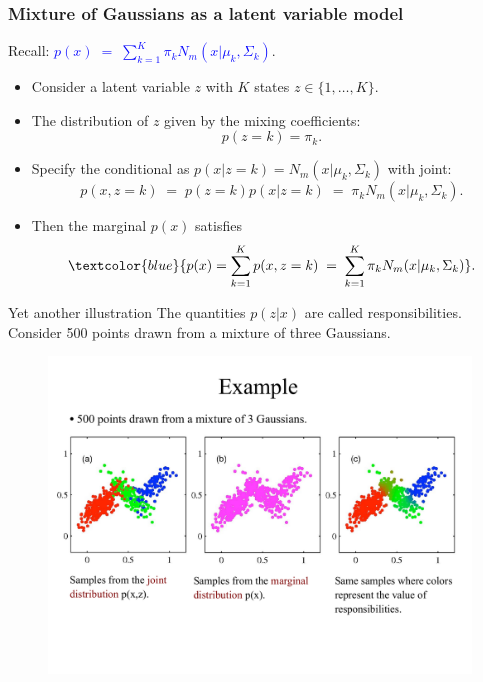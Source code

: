 \documentclass[11pt,handout,aspectratio=169]{beamer}
\begin{document}
\begin{frame}
\frametitle{Mixture of Gaussians as a latent variable model}
Recall: \textcolor{blue}{$p(x)\;=\;\sum_{k=1}^K \pi_k N_m(x|\mu_k,\Sigma_k)$}.\\[.3cm]
\begin{itemize}
	\item Consider a latent variable $z$ with $K$ states $z\in \{1,\ldots,K\}$. 
	\item The distribution of $z$ given by the mixing coefficients: $$p(z=k)=\pi_k.$$
	\item Specify the conditional as $p(x|z=k)=N_m(x|\mu_k,\Sigma_k)$ with joint: $$p(x,z=k)\;=\;p(z=k)p(x|z=k)\;=\;\pi_k N_m(x|\mu_k,\Sigma_k).$$
	\item Then the marginal $p(x)$ satisfies $$\textcolor{blue}{p(x)=\sum_{k=1}^K p(x,z=k)\;=\;\sum_{k=1}^K \pi_k N_m(x|\mu_k,\Sigma_k)}.$$
\end{itemize}
\end{frame}

\begin{frame}{Yet another illustration}
The quantities $p(z|x)$ are called responsibilities.\\[3mm]
Consider 500 points drawn from a mixture of three Gaussians. 
\begin{figure}
\includegraphics[width=4.8in]{pics/raw2.pdf}
\end{figure}
\end{frame}
\end{document}
